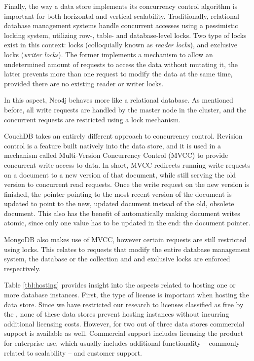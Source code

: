 Finally, the way a data store implements its concurrency control algorithm is important for both horizontal and vertical scalability.
Traditionally, relational database management systems handle concurrent accesses using a pessimistic locking system, utilizing row-, table- and database-level locks.
Two type of locks exist in this context:  locks (colloquially known as \textit{reader locks}), and exclusive locks (\textit{writer locks}).
The former implements a mechanism to allow an undetermined amount of requests to access the data without mutating it, the latter prevents more than one request to modify the data at the same time, provided there are no existing reader or writer locks.

In this aspect, Neo4j behaves more like a relational database.
As mentioned before, all write requests are handled by the master node in the cluster, and the concurrent requests are restricted using a lock mechanism.

CouchDB takes an entirely different approach to concurrency control.
Revision control is a feature built natively into the data store, and it is used in a mechanism called Multi-Version Concurrency Control (MVCC) to provide concurrent write access to data.
In short, MVCC redirects running write requests on a document to a new version of that document, while still serving the old version to concurrent read requests.
Once the write request on the new version is finished, the pointer pointing to the most recent version of the document is updated to point to the new, updated document instead of the old, obsolete document.
This also has the benefit of automatically making document writes atomic, since only one value has to be updated in the end: the document pointer.

MongoDB also makes use of MVCC, however certain requests are still restricted using locks.
This relates to requests that modify the entire database management system, the database or the collection and  and exclusive locks are enforced respectively.

\begin{landscape}
  
\end{landscape}

Table \ref{tbl:hosting} provides insight into the aspects related to hosting one or more database instances.
First, the type of license is important when hosting the data store.
Since we have restricted our research to licenses classified as free by the \textcite{FreeSoftwareFoundation1985}, none of these data stores prevent hosting instances without incurring additional licensing costs.
However, for two out of three data stores commercial support is available as well.
Commercial support includes licensing the product for enterprise use, which usually includes additional functionality -- commonly related to scalability -- and customer support.

